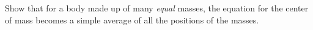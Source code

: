 Show that for a body made up of many \emph{equal} masses,
the equation for the center of mass becomes a simple average
of all the positions of the masses.
